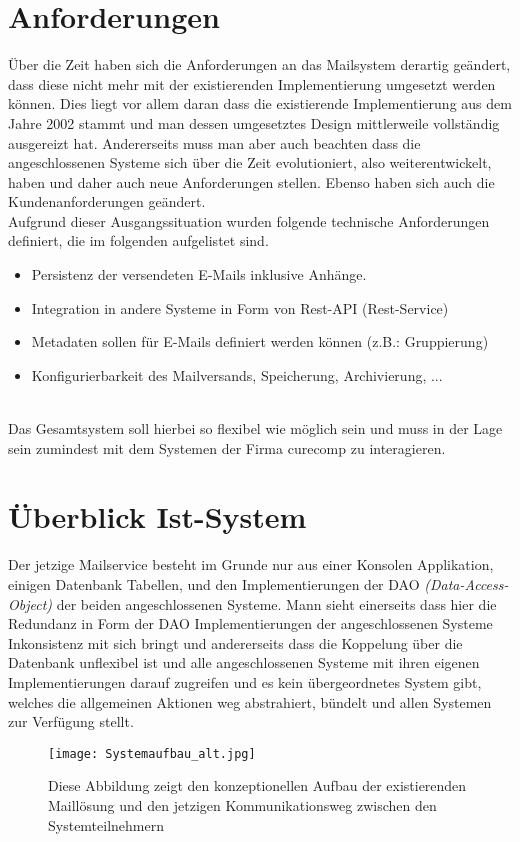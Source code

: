 \section{Anforderungen}
Über die Zeit haben sich die Anforderungen an das Mailsystem derartig geändert, dass diese nicht mehr mit der existierenden Implementierung umgesetzt werden können. Dies liegt vor allem daran dass die existierende Implementierung aus dem Jahre 2002 stammt und man dessen umgesetztes Design mittlerweile vollständig ausgereizt hat. Andererseits muss man aber auch beachten dass die angeschlossenen Systeme sich über die Zeit evolutioniert, also weiterentwickelt, haben und daher auch neue Anforderungen stellen. Ebenso haben sich auch die Kundenanforderungen geändert.
\\
Aufgrund dieser Ausgangssituation wurden folgende technische Anforderungen definiert, die im folgenden aufgelistet sind.\\
\begin{itemize}
	\item Persistenz der versendeten E-Mails inklusive Anhänge.
	\item Integration in andere Systeme in Form von Rest-API (Rest-Service)
	\item Metadaten sollen für E-Mails definiert werden können (z.B.: Gruppierung)
	\item Konfigurierbarkeit des Mailversands, Speicherung, Archivierung, ...
\end{itemize}
\ \\
Das Gesamtsystem soll hierbei so flexibel wie möglich sein und muss in der Lage sein zumindest mit dem Systemen der Firma curecomp zu interagieren. 
\newpage

\section{Überblick Ist-System} 
Der jetzige Mailservice besteht im Grunde nur aus einer Konsolen Applikation, einigen Datenbank Tabellen, und den Implementierungen der DAO \emph{(Data-Access-Object)} der beiden angeschlossenen Systeme. Mann sieht einerseits dass hier die Redundanz in Form der DAO Implementierungen der angeschlossenen Systeme Inkonsistenz mit sich bringt und andererseits dass die Koppelung über die Datenbank unflexibel ist und alle angeschlossenen Systeme mit ihren eigenen Implementierungen darauf zugreifen und es kein übergeordnetes System gibt, welches die allgemeinen Aktionen weg abstrahiert, bündelt und allen Systemen zur Verfügung stellt. 
\\
\begin{figure}[h]
\centering
\texttt{[image: Systemaufbau\_alt.jpg]} %
\caption{Diese Abbildung zeigt den konzeptionellen Aufbau der existierenden Maillösung und den jetzigen Kommunikationsweg zwischen den Systemteilnehmern}
\label{fig:systemaufbau-alt}
\end{figure}